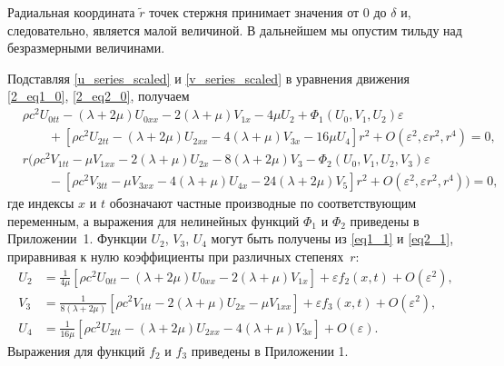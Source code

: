 \documentclass[12pt, a4paper]{report}
\begin{document}
Радиальная координата $\tilde r$ точек стержня принимает значения от $0$ до $\delta$ и, следовательно, является малой величиной.
В дальнейшем мы опустим тильду над безразмерными величинами.

Подставляя \eqref{u_series_scaled} и \eqref{v_series_scaled} в уравнения движения \eqref{2_eq1_0}, \eqref{2_eq2_0}, получаем
\begin{equation} 
\label{eq1_1}
\begin{split}
	&\rho c^2 U_{0tt} - (\lambda + 2\mu) U_{0xx} - 2(\lambda + \mu) V_{1x} - 4\mu U_2 + \Phi_1(U_0, V_1, U_2) \varepsilon\\
	&\qquad+ \left[\rho c^2 U_{2tt} - (\lambda + 2\mu)U_{2xx} - 4(\lambda + \mu)V_{3x} - 16\mu U_4\right] r^2 + O(\varepsilon^2, \varepsilon r^2, r^4) = 0,
\end{split}
\end{equation}
\begin{equation} \label{eq2_1}
\begin{split}
	&r \big( \rho c^2 V_{1tt} - \mu V_{1xx} - 2(\lambda + \mu)U_{2x} - 8(\lambda + 2\mu)V_3 - \Phi_2(U_0, V_1, U_2, V_3)\varepsilon \\
	&\qquad- \left[\rho c^2 V_{3tt} - \mu V_{3xx} - 4(\lambda + \mu)U_{4x} - 24(\lambda + 2\mu)V_5 \right] r^2  + O(\varepsilon^2, \varepsilon r^2, r^4)\big) = 0,
\end{split}
\end{equation}
где индексы $x$ и $t$ обозначают частные производные по соответствующим переменным, а выражения для нелинейных функций $\Phi_1$ и $\Phi_2$ приведены в Приложении~1.
Функции $ U_2 $, $ V_3 $, $ U_4 $ могут быть получены из \eqref{eq1_1} и \eqref{eq2_1}, приравнивая к нулю коэффициенты при различных степенях~$r$:
\begin{align}
\label{U2}
U_2 &= \frac{1}{4\mu} \left[ \rho c^2 U_{0tt} - (\lambda + 2\mu) U_{0xx} - 2(\lambda + \mu) V_{1x} \right] + \varepsilon f_2(x,t) + O(\varepsilon^2),\\
\label{V3}
V_3 &= \frac{1}{8(\lambda + 2\mu)} \left[ \rho c^2 V_{1tt} - 2(\lambda + \mu) U_{2x} - \mu V_{1xx} \right] + \varepsilon f_3(x,t) + O(\varepsilon^2),\\
\label{U4}
U_4 &= \frac{1}{16\mu}\left[\rho c^2 U_{2tt} - (\lambda + 2\mu) U_{2xx} - 4(\lambda + \mu) V_{3x}\right] + O(\varepsilon).
\end{align}
Выражения для функций $f_2$ и $f_3$ приведены в Приложении 1.
\end{document}
